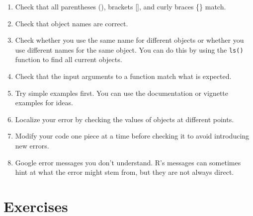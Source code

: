 \documentclass[
  letterpaper,
]{krantz}
\begin{document}
\begin{enumerate}
\def\labelenumi{\arabic{enumi}.}
\item
  Check that all parentheses (), brackets {[}{]}, and curly braces \{\}
  match.
\item
  Check that object names are correct.
\item
  Check whether you use the same name for different objects or whether
  you use different names for the same object. You can do this by using
  the \texttt{ls()} function to find all current objects.
\item
  Check that the input arguments to a function match what is expected.
\item
  Try simple examples first. You can use the documentation or vignette
  examples for ideas.
\item
  Localize your error by checking the values of objects at different
  points.
\item
  Modify your code one piece at a time before checking it to avoid
  introducing new errors.
\item
  Google error messages you don't understand. R's messages can sometimes
  hint at what the error might stem from, but they are not always
  direct.
\end{enumerate}

\hypertarget{exercises-11}{%
\section{Exercises}\label{exercises-11}}
\end{document}
